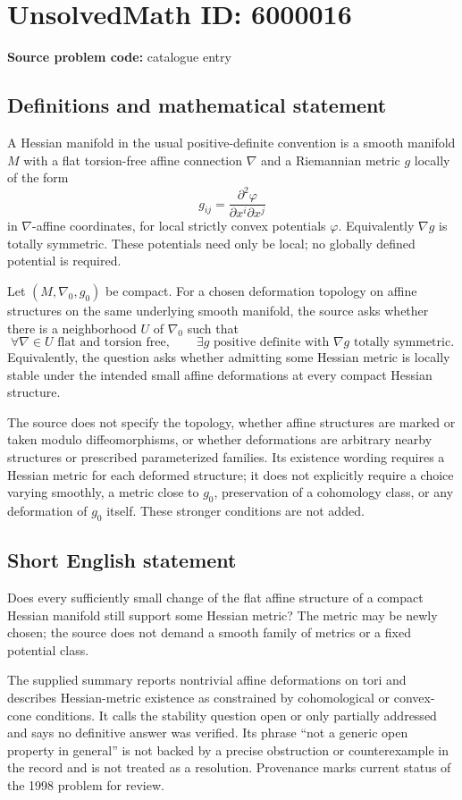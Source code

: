 \documentclass[11pt]{article}
\begin{document}
\section*{UnsolvedMath ID: 6000016}
\textbf{Source problem code:} catalogue entry
\subsection{Definitions and mathematical statement}
A Hessian manifold in the usual positive-definite convention is a smooth manifold $M$ with a flat torsion-free affine connection $\nabla$ and a Riemannian metric $g$ locally of the form
\[
 g_{ij}=\frac{\partial^2\varphi}{\partial x^i\partial x^j}
\]
in $\nabla$-affine coordinates, for local strictly convex potentials $\varphi$. Equivalently $\nabla g$ is totally symmetric. These potentials need only be local; no globally defined potential is required.

Let $(M,\nabla_0,g_0)$ be compact. For a chosen deformation topology on affine structures on the same underlying smooth manifold, the source asks whether there is a neighborhood $U$ of $\nabla_0$ such that
\[
 \forall\nabla\in U\text{ flat and torsion free},\qquad
 \exists g\text{ positive definite with }\nabla g
             \text{ totally symmetric}.
\]
Equivalently, the question asks whether admitting some Hessian metric is locally stable under the intended small affine deformations at every compact Hessian structure.

The source does not specify the topology, whether affine structures are marked or taken modulo diffeomorphisms, or whether deformations are arbitrary nearby structures or prescribed parameterized families. Its existence wording requires a Hessian metric for each deformed structure; it does not explicitly require a choice varying smoothly, a metric close to $g_0$, preservation of a cohomology class, or any deformation of $g_0$ itself. These stronger conditions are not added.
\subsection{Short English statement}
Does every sufficiently small change of the flat affine structure of a compact Hessian manifold still support some Hessian metric? The metric may be newly chosen; the source does not demand a smooth family of metrics or a fixed potential class.

The supplied summary reports nontrivial affine deformations on tori and describes Hessian-metric existence as constrained by cohomological or convex-cone conditions. It calls the stability question open or only partially addressed and says no definitive answer was verified. Its phrase ``not a generic open property in general'' is not backed by a precise obstruction or counterexample in the record and is not treated as a resolution. Provenance marks current status of the 1998 problem for review.
\end{document}
